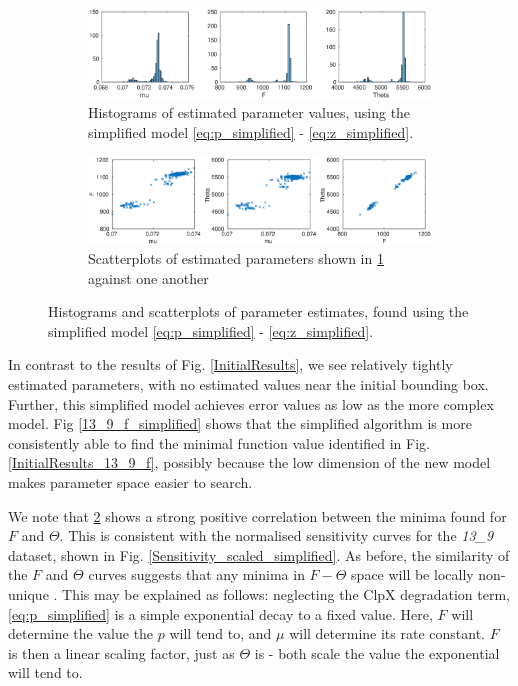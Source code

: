 \documentclass[10pt,journal]{./IEEE_latex_class/IEEEtran}
\begin{document}
\begin{figure}[h]	
	\begin{subfigure}[h]{0.49\textwidth}
    \centering
        \includegraphics[scale = 0.25 ,clip = true, trim = 100 0 60 400]{13_9_hist_simplified}
        \caption{Histograms of estimated parameter values, using the simplified model \eqref{eq:p_simplified} - \eqref{eq:z_simplified}.}
        \label{13_9_hist_simplified} 
    \end{subfigure}
    \begin{subfigure}[h]{0.49\textwidth}
    \centering
        \includegraphics[scale =  0.25 ,clip = true, trim = 100 0 60 400]{13_9_scatterplot_simplified}
        \caption{Scatterplots of estimated parameters shown in \ref{13_9_hist_simplified}  against one another}
                \label{13_9_scatterplot_simplified} 
    \end{subfigure}
    \caption{Histograms and scatterplots of parameter estimates, found using the simplified model \eqref{eq:p_simplified} - \eqref{eq:z_simplified}.} 
\label{SimplifiedModelResults}   
\end{figure}

 In contrast to the results of Fig. \ref{InitialResults}, we see relatively tightly estimated parameters, with no estimated values near the initial bounding box. Further, this simplified model achieves error values as low as the more complex model. Fig \ref{13_9_f_simplified} shows that the simplified algorithm is more consistently able to find the minimal function value identified in Fig. \ref{InitialResults_13_9_f}, possibly because the low dimension of the new model makes parameter space easier to search.
 
 We note that \ref{13_9_scatterplot_simplified} shows a strong positive correlation between the minima found for $F$ and $\Theta$. This is consistent with the  normalised sensitivity curves for the \textit{13\_9} dataset, shown in Fig. \ref{Sensitivity_scaled_simplified}. As before, the similarity of the $F$ and $\Theta$ curves suggests that any minima in $F - \Theta$ space will be locally non-unique \cite{Beck}. This may be explained as follows: neglecting the ClpX degradation term, \eqref{eq:p_simplified} is a simple exponential decay to a fixed value. Here, $F$ will determine the value the $p$ will tend to, and $\mu$ will determine its rate constant. $F$ is then a linear scaling factor, just as $\Theta$ is - both scale the value the exponential will tend to. 
 
\end{document}
